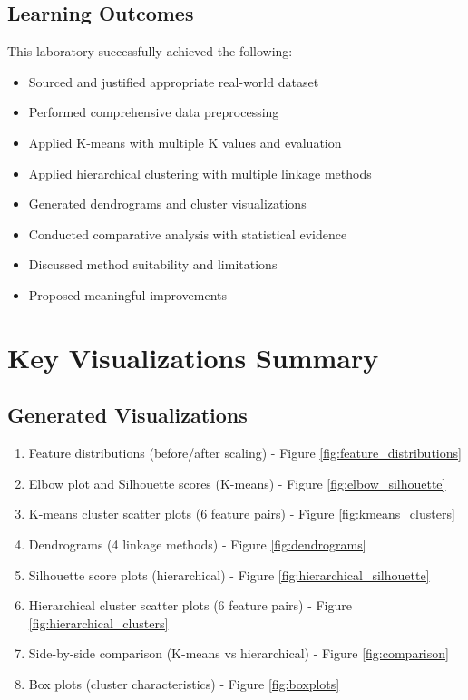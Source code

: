 \documentclass[12pt,a4paper]{article}
\begin{document}
\subsection{Learning Outcomes}

This laboratory successfully achieved the following:

\begin{itemize}
    \item[$\checkmark$] Sourced and justified appropriate real-world dataset
    \item[$\checkmark$] Performed comprehensive data preprocessing
    \item[$\checkmark$] Applied K-means with multiple K values and evaluation
    \item[$\checkmark$] Applied hierarchical clustering with multiple linkage methods
    \item[$\checkmark$] Generated dendrograms and cluster visualizations
    \item[$\checkmark$] Conducted comparative analysis with statistical evidence
    \item[$\checkmark$] Discussed method suitability and limitations
    \item[$\checkmark$] Proposed meaningful improvements
\end{itemize}

\newpage

\section{Key Visualizations Summary}

\subsection{Generated Visualizations}

\begin{enumerate}
    \item[$\checkmark$] Feature distributions (before/after scaling) - Figure \ref{fig:feature_distributions}
    \item[$\checkmark$] Elbow plot and Silhouette scores (K-means) - Figure \ref{fig:elbow_silhouette}
    \item[$\checkmark$] K-means cluster scatter plots (6 feature pairs) - Figure \ref{fig:kmeans_clusters}
    \item[$\checkmark$] Dendrograms (4 linkage methods) - Figure \ref{fig:dendrograms}
    \item[$\checkmark$] Silhouette score plots (hierarchical) - Figure \ref{fig:hierarchical_silhouette}
    \item[$\checkmark$] Hierarchical cluster scatter plots (6 feature pairs) - Figure \ref{fig:hierarchical_clusters}
    \item[$\checkmark$] Side-by-side comparison (K-means vs hierarchical) - Figure \ref{fig:comparison}
    \item[$\checkmark$] Box plots (cluster characteristics) - Figure \ref{fig:boxplots}
\end{enumerate}
\end{document}
